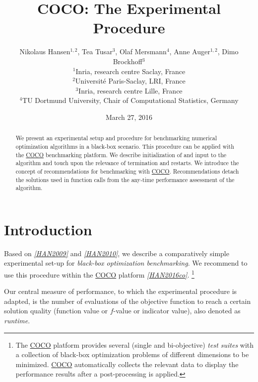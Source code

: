\documentclass[letterpaper,12pt,english]{article}
\title{{COCO}: The Experimental Procedure}
\date{March 27, 2016}
\author{Nikolaus Hansen$^{1,2}$, 
      Tea Tusar$^3$, 
      Olaf Mersmann$^4$, 
      Anne Auger$^{1,2}$, 
      Dimo Brockhoff$^3$
  \\
    $^1$Inria, research centre Saclay, France
  \\
   $^2$Universit\'e Paris-Saclay, LRI, France
  \\
    $^3$Inria, research centre Lille, France
  \\
    $^4$TU Dortmund University, Chair of Computational Statistics, Germany
    }
\newcommand{\chapter}[1]{}  %
\begin{document}
\maketitle
{}\label{index::doc}



\chapter{CHAPTERTITLE}
\label{index:coco-experimental-procedure}\label{index:chaptertitle}%
\begin{abstract}
We present an experimental setup and procedure for benchmarking numerical
optimization algorithms in a black-box scenario. This procedure can be
applied with the \href{https://github.com/numbbo/coco}{COCO} benchmarking platform.
We describe initialization of and input to the algorithm and touch
upon the relevance of termination and restarts.
We introduce the concept of recommendations for benchmarking with \href{https://github.com/numbbo/coco}{COCO}.
Recommendations detach the solutions used in function calls from the any-time
performance assessment of the algorithm.
\end{abstract}\tableofcontents
\newpage

\section{Introduction}
\label{index:introduction}
Based on \label{index:id4}{\hyperref[index:han2009]{\emph{{[}HAN2009{]}}}} and \label{index:id5}{\hyperref[index:han2010]{\emph{{[}HAN2010{]}}}}, we describe a comparatively simple experimental
set-up for \emph{black-box optimization benchmarking}. We recommend to use this procedure
within the \href{https://github.com/numbbo/coco}{COCO} platform \label{index:id6}{\hyperref[index:han2016co]{\emph{{[}HAN2016co{]}}}}. \footnote[1]{
The \href{https://github.com/numbbo/coco}{COCO} platform provides
several (single and bi-objective) \emph{test suites} with a collection of
black-box optimization problems of different dimensions to be
minimized. \href{https://github.com/numbbo/coco}{COCO} automatically collects the relevant data to display
the performance results after a post-processing is applied.
}

Our central measure of performance, to which the experimental procedure is
adapted, is the number of evaluations of the objective function to reach a
certain solution quality (function value or \(f\)-value or indicator
value), also denoted as \emph{runtime}.
\end{document}
